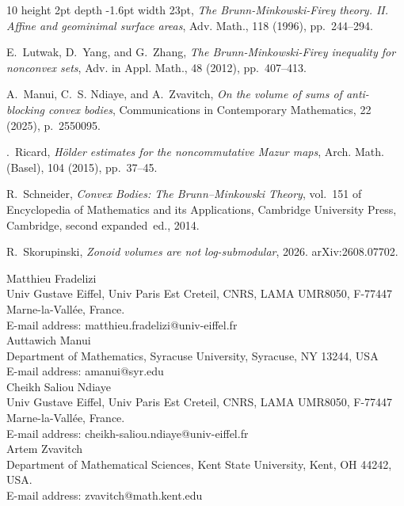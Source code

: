 \documentclass[11pt,a4paper]{amsart}
\theoremstyle{plain}
\theoremstyle{definition}
\begin{document}
\begin{thebibliography}{10}
\leavevmode\vrule height 2pt depth -1.6pt width 23pt, {\em The {B}runn-{M}inkowski-{F}irey theory. {II}. {A}ffine and geominimal surface areas}, Adv. Math., 118 (1996), pp.~244--294.

{\sc E.~Lutwak, D.~Yang, and G.~Zhang}, {\em The {B}runn-{M}inkowski-{F}irey inequality for nonconvex sets}, Adv. in Appl. Math., 48 (2012), pp.~407--413.

{\sc A.~Manui, C.~S. Ndiaye, and A.~Zvavitch}, {\em On the volume of sums of anti-blocking convex bodies}, Communications in Contemporary Mathematics, 22 (2025), p.~2550095.

{.~Ricard}, {\em H{\"o}lder estimates for the noncommutative {M}azur maps}, Arch. Math. (Basel), 104 (2015), pp.~37--45.

{\sc R.~Schneider}, {\em Convex Bodies: The {B}runn--{M}inkowski Theory}, vol.~151 of Encyclopedia of Mathematics and its Applications, Cambridge University Press, Cambridge, second expanded~ed., 2014.

{\sc R.~Skorupinski}, {\em Zonoid volumes are not log-submodular}, 2026.
\newblock arXiv:2608.07702.

\end{thebibliography}
\bigskip
\noindent Matthieu Fradelizi
\\
Univ Gustave Eiffel, Univ Paris Est Creteil, CNRS, LAMA UMR8050, F-77447 Marne-la-Vall\'ee, France.
\\
E-mail address: matthieu.fradelizi@univ-eiffel.fr
\vspace{2mm}
\\
\noindent Auttawich Manui 
\\
Department of Mathematics, Syracuse University, Syracuse, NY 13244, USA
\\
E-mail address: amanui@syr.edu
\vspace{2mm}
\\
\noindent Cheikh Saliou Ndiaye
\\
Univ Gustave Eiffel, Univ Paris Est Creteil, CNRS, LAMA UMR8050, F-77447 Marne-la-Vall\'ee, France.
\\
E-mail address: cheikh-saliou.ndiaye@univ-eiffel.fr
\vspace{2mm}
\\
\noindent Artem Zvavitch
\\
Department of Mathematical Sciences, Kent State University, Kent, OH 44242, USA. 
\\ E-mail address: zvavitch@math.kent.edu
\end{document}
